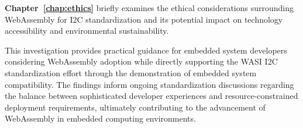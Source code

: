 \textbf{Chapter~\ref{chap:ethics}} briefly examines the ethical considerations surrounding WebAssembly for I2C standardization and its potential impact on technology accessibility and environmental sustainability.

This investigation provides practical guidance for embedded system developers considering WebAssembly adoption while directly supporting the WASI I2C standardization effort through the demonstration of embedded system compatibility. The findings inform ongoing standardization discussions regarding the balance between sophisticated developer experiences and resource-constrained deployment requirements, ultimately contributing to the advancement of WebAssembly in embedded computing environments.